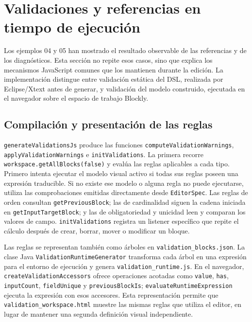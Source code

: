 \section{Validaciones y referencias en tiempo de ejecución}
\label{sec:implementacion-validaciones-referencias}

Los ejemplos 04 y 05 han mostrado el resultado observable de las referencias y
de los diagnósticos. Esta sección no repite esos casos, sino que explica los
mecanismos JavaScript comunes que los mantienen durante la edición. La
implementación distingue entre validación estática del DSL, realizada por
Eclipse/Xtext antes de generar, y validación del modelo construido, ejecutada
en el navegador sobre el espacio de trabajo Blockly.

\subsection{Compilación y presentación de las reglas}

\texttt{generateValidationsJs} produce las funciones
\texttt{computeValidation}\allowbreak\texttt{Warnings},
\texttt{applyValidation}\allowbreak\texttt{Warnings} e
\texttt{init}\allowbreak\texttt{Validations}. La primera recorre
\texttt{workspace.}\allowbreak\texttt{getAllBlocks(false)} y evalúa las reglas
aplicables a cada tipo. Primero intenta ejecutar el modelo visual activo si
todas sus reglas poseen una expresión traducible. Si no existe ese modelo o
alguna regla no puede ejecutarse, utiliza las comprobaciones emitidas
directamente desde \texttt{EditorSpec}. Las reglas de orden consultan
\texttt{getPreviousBlock}; las de cardinalidad siguen la cadena iniciada en
\texttt{getInputTargetBlock}; y las de obligatoriedad y unicidad leen y
comparan los valores de campo. \texttt{initValidations} registra un listener
específico que repite el cálculo después de crear, borrar, mover o modificar un
bloque.

Las reglas se representan también como árboles en
\texttt{validation\_blocks.json}. La clase Java
\texttt{ValidationRuntimeGenerator} transforma cada árbol en una expresión para el
entorno de ejecución y genera \texttt{validation\_runtime.js}. En el navegador,
\texttt{createValidationAccessors} ofrece operaciones acotadas como
\texttt{value}, \texttt{has}, \texttt{inputCount}, \texttt{fieldUnique} y
\texttt{previousBlockIs}; \texttt{evaluateRuntimeExpression} ejecuta la
expresión con esos accesores. Esta representación permite que
\texttt{validation\_}\allowbreak\texttt{workspace.html} muestre las mismas reglas que utiliza el
editor, en lugar de mantener una segunda definición visual independiente.

